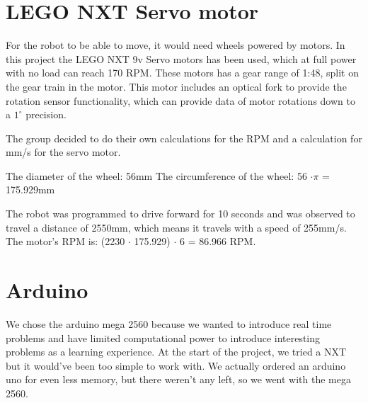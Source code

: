 \section{LEGO NXT Servo motor}
\label{sec:LEGO NXT Servo motor}
For the robot to be able to move, it would need wheels powered by motors. In this project the LEGO NXT 9v Servo motors has been used, which at full power with no load can reach 170 RPM. These motors has a gear range of 1:48, split on the gear train in the motor. \citep{Servo} This motor includes an optical fork to provide the rotation sensor functionality, which can provide data of motor rotations down to a \(1^{\circ}\) precision.

The group decided to do their own calculations for the RPM and a calculation for mm/s for the servo motor. 

The diameter of the wheel: 56mm \newline
The circumference of the wheel: 56 \begin{math}\cdot \pi \end{math} = 175.929mm

The robot was programmed to drive forward for 10 seconds and was observed to travel a distance of 2550mm, which means it travels with a speed of 255mm/s. \newline
The motor’s RPM is: (2230 \begin{math} \cdot \end{math} 175.929) \begin{math} \cdot \end{math} 6 = 86.966 RPM.


\section{Arduino}
\label{sec:Arduino}
We chose the arduino mega 2560 because we wanted to introduce real time problems and have limited computational power to introduce interesting problems as a learning experience. At the start of the project, we tried a NXT but it would’ve been too simple to work with. We actually ordered an arduino uno for even less memory, but there weren’t any left, so we went with the mega 2560. \citep{a}

